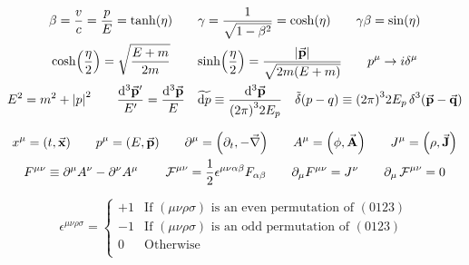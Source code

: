 \begin{gather*}
        \beta
        = \frac{v}{c}
        = \frac{p}{E}
        = \tanh(\eta)
        \qquad
        \gamma
        = \frac{1}{\sqrt{1-\beta^2}}
        = \cosh(\eta)
        \qquad
        \gamma\beta = \sin(\eta)
        \\
        \cosh(\frac{\eta}{2}) = \sqrt{\frac{E+m}{2m}}
        \qquad
        \sinh(\frac{\eta}{2}) = \frac{\abs{\va{p}}}{\sqrt{2m\qty(E+m)}}
        \qquad
        p^\mu \to i \delta^\mu
        \\
        E^2 = m^2 + \abs{p}^2
        \qquad
        \frac{\dd[3]{\va{p}'}}{E'} = \frac{\dd[3]{\va{p}}}{E}
        \quad
        \widetilde{\dd{p}} \equiv \frac{\dd[3]{\va{p}}}{\qty(2\pi)^32E_p}
        \quad
        \tilde{\delta}\qty(p-q) \equiv \qty(2\pi)^32E_p\Ddelta[3](\va{p}-\va{q})
\end{gather*}

\begin{gather*}
        x^{\mu} = (t, \va{x})
        \qquad
        p^{\mu} = (E, \va{p})
        \qquad
        \partial^{\mu} = \qty(\partial_t, -\va{\nabla})
        \qquad
        A^{\mu} = \qty(\phi, \va{A})
        \qquad
        J^{\mu} = \qty(\rho, \va{J})
        \\
        F^{\mu\nu} \equiv \partial^\mu A^\nu - \partial^\nu A^\mu
        \qquad
        \operatorname{\mathcal{F}}^{\mu\nu} = \frac{1}{2}\epsilon^{\mu\nu\alpha\beta}F_{\alpha\beta}
        \qquad
        \partial_\mu F^{\mu\nu} = J^{\nu}
        \qquad
        \partial_\mu \operatorname{\mathcal{F}}^{\mu\nu} = 0
\end{gather*}

\begin{equation*}
        \epsilon^{\mu\nu\rho\sigma} = \begin{cases}
                +1 &\text{If $(\mu\nu\rho\sigma)$ is an even permutation of $(0123)$} \\
                -1 &\text{If $(\mu\nu\rho\sigma)$ is an odd permutation of $(0123)$} \\
                0  &\text{Otherwise} \\
        \end{cases}
\end{equation*}

